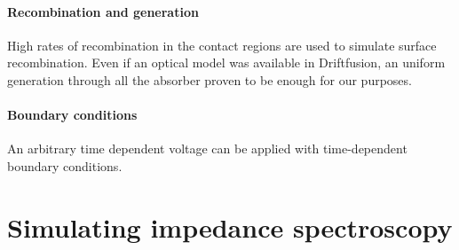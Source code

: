 	\paragraph{Recombination and generation}
	High rates of recombination in the contact regions are used to simulate surface recombination.
	Even if an optical model was available in Driftfusion, an uniform generation through all the absorber proven to be enough for our purposes.

	\paragraph{Boundary conditions}
	An arbitrary time dependent voltage can be applied with time\hyp{}dependent boundary conditions.
	
	
	

\section{Simulating impedance spectroscopy}

